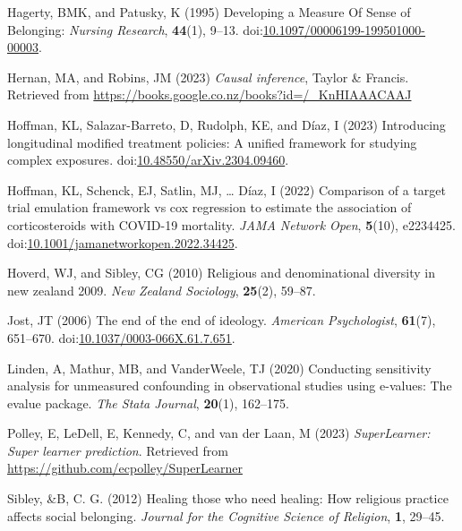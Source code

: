 \documentclass[
  singlecolumn]{article}
\newlength{\cslhangindent}
\newenvironment{CSLReferences}[2] %
 {\begin{list}{}{%
  \setlength{\itemindent}{0pt}
  \setlength{\leftmargin}{0pt}
  \setlength{\parsep}{0pt}
  \ifodd #1
   \setlength{\leftmargin}{\cslhangindent}
   \setlength{\itemindent}{-1\cslhangindent}
  \fi
  \setlength{\itemsep}{#2\baselineskip}}}
 {\end{list}}
\begin{document}
\begin{CSLReferences}{1}{0}
Hagerty, BMK, and Patusky, K (1995) Developing a Measure Of Sense of
Belonging: \emph{Nursing Research}, \textbf{44}(1), 9--13.
doi:\href{https://doi.org/10.1097/00006199-199501000-00003}{10.1097/00006199-199501000-00003}.

Hernan, MA, and Robins, JM (2023) \emph{Causal inference}, Taylor \&
Francis. Retrieved from
\url{https://books.google.co.nz/books?id=/_KnHIAAACAAJ}

Hoffman, KL, Salazar-Barreto, D, Rudolph, KE, and Díaz, I (2023)
Introducing longitudinal modified treatment policies: A unified
framework for studying complex exposures.
doi:\href{https://doi.org/10.48550/arXiv.2304.09460}{10.48550/arXiv.2304.09460}.

Hoffman, KL, Schenck, EJ, Satlin, MJ, \ldots{} Díaz, I (2022) Comparison
of a target trial emulation framework vs cox regression to estimate the
association of corticosteroids with COVID-19 mortality. \emph{JAMA
Network Open}, \textbf{5}(10), e2234425.
doi:\href{https://doi.org/10.1001/jamanetworkopen.2022.34425}{10.1001/jamanetworkopen.2022.34425}.

Hoverd, WJ, and Sibley, CG (2010) Religious and denominational diversity
in new zealand 2009. \emph{New Zealand Sociology}, \textbf{25}(2),
59--87.

Jost, JT (2006) The end of the end of ideology. \emph{American
Psychologist}, \textbf{61}(7), 651--670.
doi:\href{https://doi.org/10.1037/0003-066X.61.7.651}{10.1037/0003-066X.61.7.651}.

Linden, A, Mathur, MB, and VanderWeele, TJ (2020) Conducting sensitivity
analysis for unmeasured confounding in observational studies using
e-values: The evalue package. \emph{The Stata Journal}, \textbf{20}(1),
162--175.

Polley, E, LeDell, E, Kennedy, C, and van der Laan, M (2023)
\emph{SuperLearner: Super learner prediction}. Retrieved from
\url{https://github.com/ecpolley/SuperLearner}

Sibley, \&B, C. G. (2012) Healing those who need healing: How religious
practice affects social belonging. \emph{Journal for the Cognitive
Science of Religion}, \textbf{1}, 29--45.


\end{CSLReferences}
\end{document}
